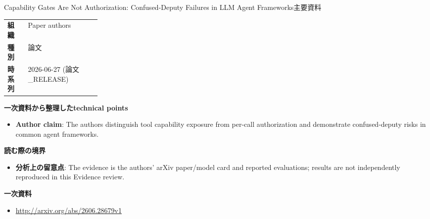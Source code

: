 \begin{technicalnote}{Capability Gates Are Not Authorization: Confused-Deputy Failures in LLM Agent Frameworks}{主要資料}
\begin{tabularx}{\linewidth}{@{}>{\bfseries}p{0.22\linewidth}X@{}}
組織 & Paper authors \\
種別 & 論文 \\
時系列 & 2026-06-27 (論文\_RELEASE) \\
\end{tabularx}
\smallskip
{\bfseries 一次資料から整理したtechnical points}
\begin{itemize}[leftmargin=1.5em,itemsep=0.35em]
\item \textbf{Author claim}: The authors distinguish tool capability exposure from per-call authorization and demonstrate confused-deputy risks in common agent frameworks.
\end{itemize}
{\bfseries 読む際の境界}
\begin{itemize}[leftmargin=1.5em,itemsep=0.35em]
\item \textbf{分析上の留意点}: The evidence is the authors' arXiv paper/model card and reported evaluations; results are not independently reproduced in this Evidence review.
\end{itemize}
{\bfseries 一次資料}
\begingroup\sloppy
\begin{itemize}[leftmargin=1.5em,itemsep=0.25em]
\item {\scriptsize\url{http://arxiv.org/abs/2606.28679v1}}
\end{itemize}
\endgroup
\end{technicalnote}
\medskip

